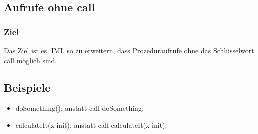 \documentclass[a4paper,10pt]{article}
\begin{document}
\subsection{Aufrufe ohne call}
\subsubsection{Ziel}
Das Ziel ist es, IML so zu erweitern, dass Prozeduraufrufe ohne das
Schlüsselwort call möglich sind.
\subsection{Beispiele}
\begin{itemize}
\item doSomething(); anstatt call doSomething;
\item calculateIt(x init); anstatt call calculateIt(x init);
\end{itemize}
\end{document}
